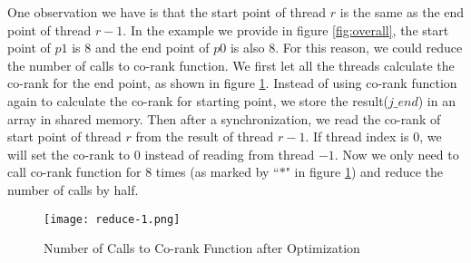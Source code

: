         One observation we have is that the start point of thread $r$ is the same as 
        the end point of thread $r-1$. In the example we provide in figure \ref{fig:overall}, 
        the start point of $p1$ is $8$ and the end point of $p0$ is also $8$. 
        For this reason, we could reduce the number of calls to co-rank function. 
        We first let all the threads calculate the co-rank for the end point, 
        as shown in figure \ref{fig:reduce-1}.
        Instead of using co-rank function again to calculate the co-rank for starting point,
        we store the result($j\_end$) in an array in shared memory.  
        Then after a synchronization, we read the co-rank of start point of thread $r$
        from the result of thread $r-1$. If thread index is $0$, we will set the co-rank to $0$ 
        instead of reading from thread $-1$. Now we only need to call co-rank function for
        $8$ times (as marked by ``$*$" in figure \ref{fig:reduce-1}) and reduce the number of calls by half.     

        \begin{figure}[!h]
        \begin{center}
        \texttt{[image: reduce-1.png]}
        \end{center}
        \caption{{\label{fig:reduce-1}} Number of Calls to Co-rank Function after Optimization}
        \end{figure}


